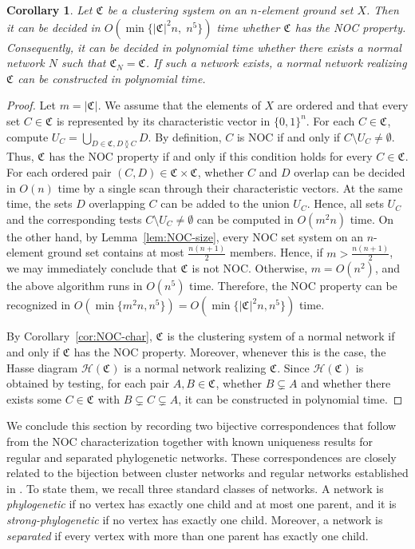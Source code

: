 \documentclass[preprint]{elsarticle}
\newtheorem{corollary}[theorem]{Corollary}
\newcommand{\CS}[1][]{\ensuremath{\mathfrak{C}_{#1}}}
\newcommand{\overlaps}{\between}
\newcommand{\Hasse}{\ensuremath{\mathcal{H}}}
\begin{document}
\begin{corollary}\label{cor:noc-polytime}
Let $\CS$ be a clustering system on an $n$-element ground set $X$. Then it can be decided in 
$ O(\min\{|\CS|^2n,\; n^5\}) $
time whether $\CS$ has the NOC property. Consequently, it can be decided in polynomial time
whether there exists a normal network $N$ such that $\CS[N]=\CS$. If such a network exists, a normal
network realizing $\CS$ can be constructed in polynomial time.
\end{corollary}
\begin{proof}
Let $m=|\CS|$. We assume that the elements of $X$ are ordered and that every set $C\in\CS$ is
represented by its characteristic vector in $\{0,1\}^n$. For each $C\in\CS$, compute
$U_C=\bigcup_{{D\in\CS,D\overlaps C}} D$. By definition, $C$ is NOC if and only if $C\setminus
U_C\neq\emptyset$. Thus, $\CS$ has the NOC property if and only if this condition holds for every
$C\in\CS$. For each ordered pair $(C,D)\in\CS\times\CS$, whether $C$ and $D$ overlap can be decided
in $O(n)$ time by a single scan through their characteristic vectors. 
At the same time, the sets $D$ overlapping $C$ can be
added to the union $U_C$. Hence, all sets $U_C$ and the corresponding tests $C\setminus
U_C\neq\emptyset$ can be computed in $O(m^2n)$ time. On the other hand, by
Lemma~\ref{lem:NOC-size}, every NOC set system on an $n$-element ground set contains at most $
\frac{n(n+1)}2 $ members. Hence, if $m>\frac{n(n+1)}2$, we may immediately conclude that $\CS$ is
not NOC. Otherwise, $m=O(n^2)$, and the above algorithm runs in $O(n^5)$ time. Therefore, the NOC
property can be recognized in $ O(\min\{m^2n,n^5\}) = O(\min\{|\CS|^2n,n^5\}) $ time.

By Corollary~\ref{cor:NOC-char}, $\CS$ is the clustering system of a normal network
if and only if $\CS$ has the NOC property. Moreover, whenever this is the case, the
Hasse diagram $\Hasse(\CS)$ is a normal network realizing $\CS$. Since $\Hasse(\CS)$ is obtained by
testing, for each pair $A,B\in\CS$, whether $B\subsetneq A$ and whether there exists some $C\in\CS$
with $B\subsetneq C\subsetneq A$, it can be constructed in polynomial time.
\end{proof}


We conclude this section by recording two bijective correspondences that follow from the
NOC characterization together with known uniqueness results for regular and separated
phylogenetic networks. These correspondences are closely related to the bijection between
cluster networks and regular networks established in \cite[Thm.~3.8]{ALRR:14}. To state them, we
recall three standard classes of networks. A network is \emph{phylogenetic} if no vertex has
exactly one child and at most one parent, and it is \emph{strong-phylogenetic} if no vertex has
exactly one child. Moreover, a network is \emph{separated} if every vertex with more than one parent has exactly one child.
\end{document}
